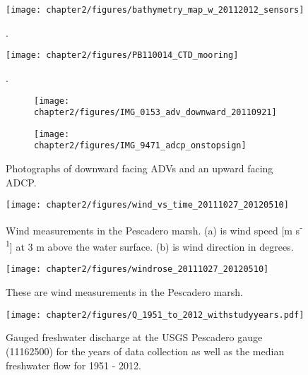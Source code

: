 {\begin{figure}
	\begin{center}
		\texttt{[image: chapter2/figures/bathymetry\_map\_w\_20112012\_sensors]} \caption{.}\label{fig:BathyCh2}
	\end{center}
\end{figure}


\begin{figure}
	\begin{center}
		\texttt{[image: chapter2/figures/PB110014\_CTD\_mooring]} \caption{.}\label{fig:CTDphoto}
	\end{center}
\end{figure}


\begin{figure}[t]
\begin{subfigure}{.5\textwidth}
	\texttt{[image: chapter2/figures/IMG\_0153\_adv\_downward\_20110921]}
\end{subfigure}
\begin{subfigure}{.5\textwidth}
	\texttt{[image: chapter2/figures/IMG\_9471\_adcp\_onstopsign]}
\end{subfigure}
\caption{Photographs of downward facing ADVs and an upward facing ADCP.} \label{fig:ADVADCPphoto}
\end{figure}


\begin{figure} %
	\texttt{[image: chapter2/figures/wind\_vs\_time\_20111027\_20120510]} \caption{Wind measurements in the Pescadero marsh. (a) is wind speed [m s\textsuperscript{-1}] at 3 m above the water surface. (b) is wind direction in degrees.}
\label{fig:metstn_pdo_ws_wdir} 
\end{figure}

 \begin{figure}
 	\begin{center}
 		\texttt{[image: chapter2/figures/windrose\_20111027\_20120510]} \caption{These are wind measurements in the Pescadero marsh.} \label{fig:metstn_pdo_windrose} 
 	\end{center}
 \end{figure}




\begin{figure}
	\begin{center}
		\texttt{[image: chapter2/figures/Q\_1951\_to\_2012\_withstudyyears.pdf]} \caption{Gauged freshwater discharge at the USGS Pescadero gauge (11162500) for the years of data collection as well as the median freshwater flow for 1951 - 2012.}\label{fig:Q_1951_2012}
	\end{center}
\end{figure}



}
